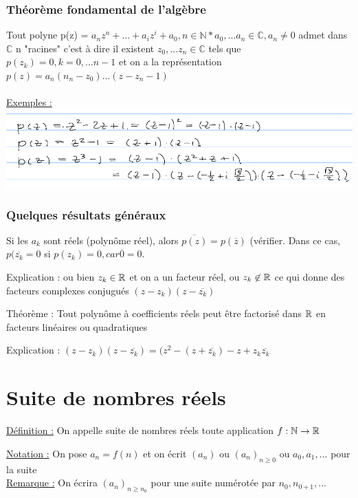 \documentclass[12pt,a4paper]{article}
\begin{document}
{\subsubsection{Théorème fondamental de l'algèbre}
Tout polyne p(z) = $a_nz^n+...+a_iz^i + a_0, n\in \mathbb{N*} a_0,...a_n \in \mathbb{C}, a_n \neq 0$ admet dans $\mathbb{C}$ n "racines" c'est à dire il existent $z_0,...z_n \in \mathbb{C}$ tels que $p(z_k) = 0, k = 0,...n-1$ et on a la représentation 
$p(z) = a_n (n_n-z_0)...(z-z_n-1)$\\
\\
\underline{Exemples :}
\\
\includegraphics[scale=0.5]{illustrations_Analyse/exemples_z}

\subsubsection{Quelques résultats généraux}
Si les $a_k$ sont réels (polynôme réel), alors $\overline{p(z)} = p(\overline{z})$ (vérifier. Dans ce cas, $p(\overline{z_k} = 0$  si $p(z_k) = 0, car \overline{0} = 0$.

Explication : ou bien $z_k \in \mathbb{R}$ et on a un facteur réel, ou $z_k \not \in \mathbb{R}$ ce qui donne des facteurs complexes conjugués $(z-z_k)(z-\overline{z_k})$

Théorème : Tout polynôme à coefficients réels peut être factorisé dans $\mathbb{R}$ en facteurs linéaires ou quadratiques

Explication : $(z-z_k)(z-\overline{z_k}) = (z^2 - (z + \overline{z_k})-z + z_k \overline{z_k}$

\section{Suite de nombres réels}
\setcounter{equation}{0}
\begin{boite}
\underline{Définition :} On appelle suite de nombres réels toute application $f:\mathbb{N} \to \mathbb{R}$
\end{boite}
\underline{Notation :} On pose $a_n = f(n)$ et on écrit $(a_n)$ ou $(a_n)_{n \geq 0}$ ou $a_0, a_1,...$ pour la suite \\
\underline{Remarque :} On écrira $(a_n)_{n \geq n_0}$ pour une suite numérotée par $n_0,n_{0+1},...$\\

}
\end{document}
